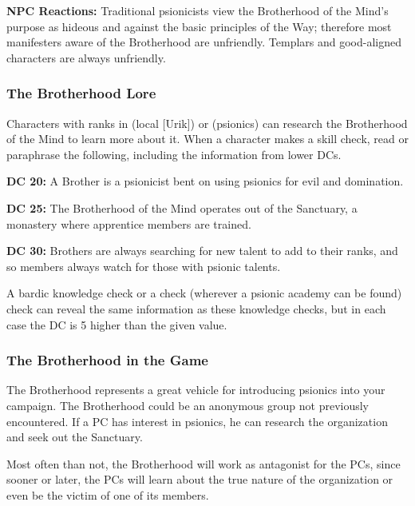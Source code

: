 \textbf{NPC Reactions:} Traditional psionicists view the Brotherhood of the Mind's purpose as hideous and against the basic principles of the Way; therefore most manifesters aware of the Brotherhood are unfriendly. Templars and good-aligned characters are always unfriendly.

\subsubsection{The Brotherhood Lore}
Characters with ranks in  (local [Urik]) or  (psionics) can research the Brotherhood of the Mind to learn more about it. When a character makes a skill check, read or paraphrase the following, including the information from lower DCs.

\textbf{DC 20:} A Brother is a psionicist bent on using psionics for evil and domination.

\textbf{DC 25:} The Brotherhood of the Mind operates out of the Sanctuary, a monastery where apprentice members are trained.

\textbf{DC 30:} Brothers are always searching for new talent to add to their ranks, and so members always watch for those with psionic talents.

A bardic knowledge check or a  check (wherever a psionic academy can be found) check can reveal the same information as these knowledge checks, but in each case the DC is 5 higher than the given value.


\subsubsection{The Brotherhood in the Game}
The Brotherhood represents a great vehicle for introducing psionics into your campaign. The Brotherhood could be an anonymous group not previously encountered. If a PC has interest in psionics, he can research the organization and seek out the Sanctuary.

Most often than not, the Brotherhood will work as antagonist for the PCs, since sooner or later, the PCs will learn about the true nature of the organization or even be the victim of one of its members.
